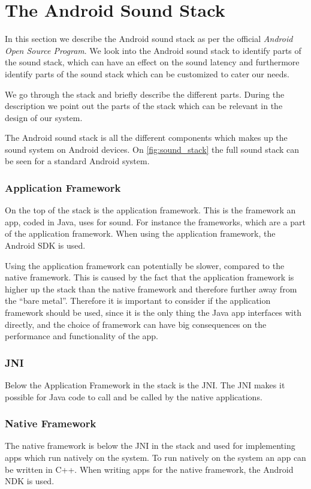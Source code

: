 \section{The Android Sound Stack}\label{sec:androidaudiostack}
In this section we describe the Android sound stack as per the official \textit{Android Open Source Program}\cite{sound_stack}.
We look into the Android sound stack to identify parts of the sound stack,
which can have an effect on the sound latency and furthermore identify parts of the sound stack which can be customized to cater our needs.

We go through the stack and briefly describe the different parts.
During the description we point out the parts of the stack which can be relevant in the design of our system.

The Android sound stack is all the different components which makes up the sound system on Android devices.
On \cref{fig:sound_stack} the full sound stack can be seen for a standard Android system.

\subsubsection*{Application Framework}
On the top of the stack is the application framework.
This is the framework an app, coded in Java, uses for sound.
For instance the  frameworks, which are a part of the application framework.
When using the application framework, the Android \ac{SDK} is used.

Using the application framework can potentially be slower, compared to the native framework.
This is caused by the fact that the application framework is higher up the stack than the native framework and therefore further away from the ``bare metal''.
Therefore it is important to consider if the application framework should be used,
since it is the only thing the Java app interfaces with directly,
and the choice of framework can have big consequences on the performance and functionality of the app.

\subsubsection*{JNI}
Below the Application Framework in the stack is the \ac{JNI}.
The \ac{JNI} makes it possible for Java code to call and be called by the native applications\cite{jni}.

\subsubsection*{Native Framework}
The native framework is below the \ac{JNI} in the stack and used for implementing apps which run natively on the system.
To run natively on the system an app can be written in C++.
When writing apps for the native framework, the Android \ac{NDK} is used.

